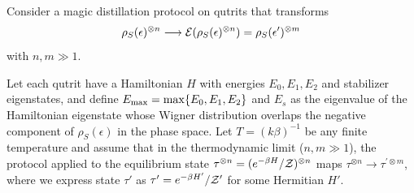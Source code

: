 \documentclass[pra,
aps,
twocolumn,
superscriptaddress,
groupedaddress,
nofootinbib,
reprint
]{revtex4-1}
\begin{document}
\begin{theorem}\label{thm:no-processing}
	Consider a magic distillation protocol on qutrits that transforms
\begin{equation*}
	\rho_S(\epsilon)^{\otimes n} \longrightarrow {\mathcal E}(\rho_S(\epsilon)^{\otimes n})=\rho_S(\epsilon')^{\otimes m} 
\end{equation*}
with $n, m \gg 1$.

Let each qutrit have a Hamiltonian $H$ with energies $E_0, E_1, E_2$ and stabilizer eigenstates, and define $E_{\rm max} = \max\{E_0, E_1, E_2\}$ and $E_s$ as the eigenvalue of the Hamiltonian eigenstate whose Wigner distribution overlaps the negative component of $\rho_S(\epsilon)$ in the phase space.
Let $T =(k\beta)^{-1}$ be any finite temperature and assume that in the thermodynamic limit ($n,m \gg 1$), the protocol applied to the equilibrium state $\tau^{\otimes n} = (e^{-\beta H}/\mathcal{Z})^{\otimes n}$ maps $\tau^{\otimes n} \longrightarrow \tau^{\prime \otimes m}$, where we express state $\tau'$ as $\tau' = e^{-\beta H'}/\mathcal{Z}'$ for some Hermitian $H'$.


\end{theorem}
\end{document}
